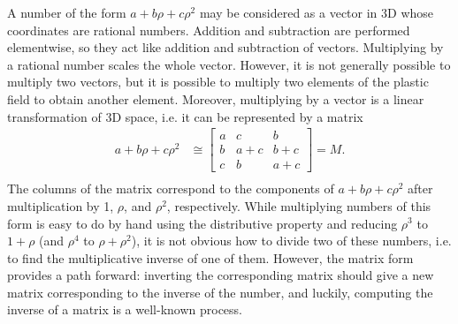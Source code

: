 \documentclass{article}
\begin{document}
A number of the form $a+b\rho+c\rho^2$
may be considered as a vector in 3D
whose coordinates are rational numbers.
Addition and subtraction are performed elementwise,
so they act like addition and subtraction of vectors.
Multiplying by a rational number scales the whole vector.
However, it is not generally possible to multiply two vectors,
but it is possible to multiply two elements of the plastic field
to obtain another element.
Moreover, multiplying by a vector is a linear transformation of 3D space,
i.e. it can be represented by a matrix
\begin{align*}
  a+b\rho+c\rho^2 &\cong
  \begin{bmatrix}
    a & c & b \\
    b & a+c & b+c \\
    c & b & a+c
  \end{bmatrix} = M. \\
\end{align*}
The columns of the matrix correspond to the components of
$a+b\rho+c\rho^2$ after multiplication by 1, $\rho$, and $\rho^2$, respectively.
While multiplying numbers of this form is easy to do by hand
using the distributive property and reducing $\rho^3$ to $1+\rho$
(and $\rho^4$ to $\rho+\rho^2$),
it is not obvious how to divide two of these numbers,
i.e. to find the multiplicative inverse of one of them.
However, the matrix form provides a path forward:
inverting the corresponding matrix should give a new matrix
corresponding to the inverse of the number,
and luckily, computing the inverse of a matrix is a well-known process.
\end{document}
